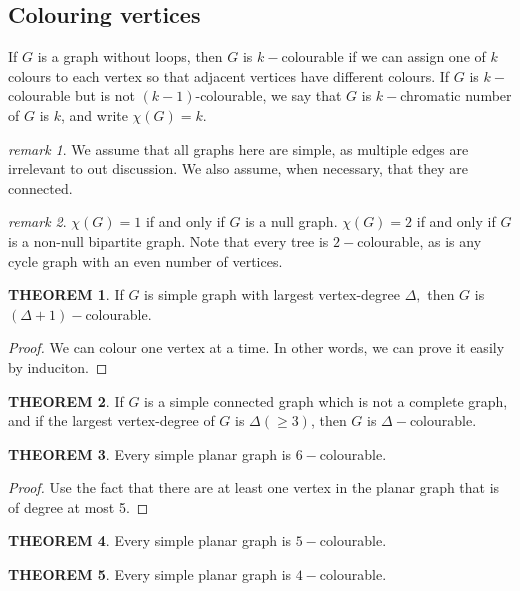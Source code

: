 \documentclass[a4paper,11pt]{article}%
\theoremstyle{remark}
\newtheorem*{remark}{remark}
\theoremstyle{definition}
\newtheorem{theorem}{THEOREM}[section]
\theoremstyle{definition}
\theoremstyle{definition}
\theoremstyle{definition}
\theoremstyle{plain}
\theoremstyle{definition}
\begin{document}
\subsection{Colouring vertices}
If $G$ is a graph without loops, then $G$ is $k-$colourable if we can assign one of $k$ colours to each vertex so that adjacent vertices 
have different colours. If $G$ is $k-$colourable but is not $(k-1)$-colourable, we say that $G$ is $k-$chromatic number of $G$ is $k$,
and write $\chi(G)=k$.
\begin{remark}
    We assume that all graphs here are simple, as multiple edges are irrelevant to out discussion. We also assume, when necessary, that they 
    are connected.
\end{remark}
\begin{remark}
    $\chi(G)=1$ if and only if $G$ is a null graph. $\chi(G)=2$ if and only if $G$ is a non-null bipartite graph.
    Note that every tree is $2-$colourable, as is any cycle graph with an even number of vertices.
\end{remark}
\begin{theorem}
    If $G$ is  simple graph with largest vertex-degree $\Delta,$ then $G$ is $(\Delta+1)-$colourable.
\end{theorem}
\begin{proof}
    We can colour one vertex at a time. In other words, we can prove it easily by induciton.
\end{proof}
\begin{theorem}
    If $G$ is a simple connected graph which is not a complete graph, and if the largest vertex-degree of $G$ is $\Delta(\geq 3)$, then 
    $G$ is $\Delta-$colourable.
\end{theorem}
\begin{theorem}
    Every simple planar graph is $6-$colourable.
\end{theorem}
\begin{proof}
    Use the fact that there are at least one vertex in the planar graph that is of degree at most 5.
\end{proof}
\begin{theorem}
    Every simple planar graph is $5-$colourable.
\end{theorem}
\begin{theorem}
    Every simple planar graph is $4-$colourable.
\end{theorem}
\end{document}
